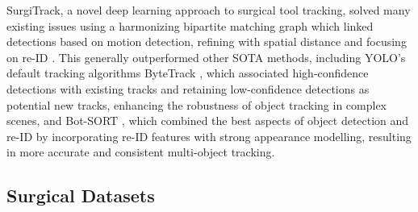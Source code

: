 SurgiTrack, a novel deep learning approach to surgical tool tracking, solved many existing issues using a harmonizing bipartite matching graph which linked detections based on motion detection, refining with spatial distance and focusing on re-ID \cite{SurgiTrack}. This generally outperformed other SOTA methods, including YOLO's default tracking algorithms ByteTrack \cite{ByteTrack}, which associated high-confidence detections with existing tracks and retaining low-confidence detections as potential new tracks, enhancing the robustness of object tracking in complex scenes, and Bot-SORT \cite{BoT-SORT}, which combined the best aspects of object detection and re-ID by incorporating re-ID features with strong appearance modelling, resulting in more accurate and consistent multi-object tracking.

\subsection{Surgical Datasets}


